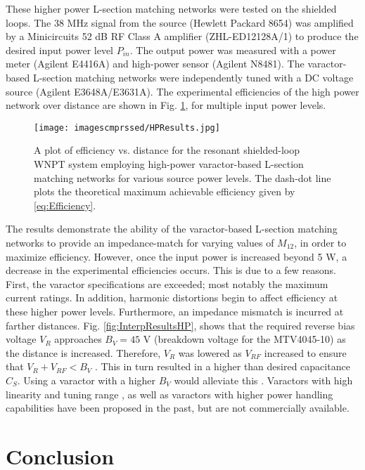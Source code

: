 \documentclass[journal]{IEEEtran}
\begin{document}
These higher power L-section matching networks were tested on the shielded loops. The 38 MHz signal from the source (Hewlett Packard 8654) was amplified by a Minicircuits 52 dB RF Class A amplifier (ZHL-ED12128A/1) to produce the desired input power level $P_{in}$. The output power was measured with a power meter (Agilent E4416A) and high-power sensor (Agilent N8481). The varactor-based L-section matching networks were independently tuned with a DC voltage source (Agilent E3648A/E3631A). The experimental efficiencies of the high power network over distance are shown in Fig. \ref{fig:HPResults}, for multiple input power levels.
\begin{figure}[htbp]
    \centering
    \texttt{[image: imagescmprssed/HPResults.jpg]}
    \caption{A plot of efficiency vs. distance for the resonant shielded-loop WNPT system employing high-power varactor-based L-section matching networks for various source power levels. The dash-dot line plots the theoretical maximum achievable efficiency given by \ref{eq:Efficiency}.}
    \label{fig:HPResults}
\end{figure}

The results demonstrate the ability of the varactor-based L-section matching networks to provide an impedance-match for varying values of $M_{12}$, in order to maximize efficiency. However, once the input power is increased beyond 5 W, a decrease in the experimental efficiencies occurs. This is due to a few reasons. First, the varactor specifications are exceeded; most notably the maximum current ratings. In addition, harmonic distortions begin to affect efficiency at these higher power levels. Furthermore, an impedance mismatch is incurred at farther distances. Fig. \ref{fig:InterpResultsHP}, shows that the required reverse bias voltage $V_{R}$ approaches $B_V=45$ V (breakdown voltage for the MTV4045-10) as the distance is increased. Therefore, $V_R$ was lowered as $V_{RF}$ increased to ensure that $V_R + V_{RF} < B_V$ \cite{VaracAmps}. This in turn resulted in a higher than desired capacitance $C_S$. Using a varactor with a higher $B_V$ would alleviate this \cite{Components2}. Varactors with high linearity and tuning range \cite{SiG1}, as well as varactors with higher power handling capabilities \cite{SiC} have been proposed in the past, but are not commercially available.

\section{Conclusion}
\end{document}
